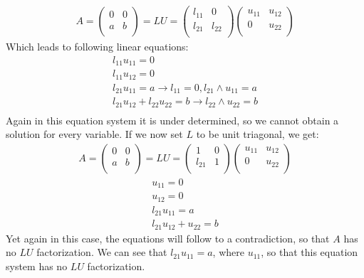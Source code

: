 \begin{gather*}
A = \left( \begin{array}{cc}
0 & 0 \\
a & b \\
\end{array} \right)
= LU = 
\left( \begin{array}{cc}
l_{11} & 0 \\
l_{21} & l_{22} \\
\end{array} \right)
\left( \begin{array}{cc}
u_{11} & u_{12} \\
0 & u_{22} \\
\end{array} \right)
\end{gather*}
Which leads to following linear equations:
\begin{gather*}
l_{11} u_{11} = 0 \\
l_{11} u_{12} = 0 \\
l_{21} u_{11} = a  \rightarrow l_{11} = 0, l_{21} \wedge u_{11} = a\\
l_{21} u_{12} + l_{22} u_{22} = b \rightarrow l_{22} \wedge u_{22} = b\\
\end{gather*}
Again in this equation system it is under determined, so we cannot obtain a solution for every variable.
If we now set $L$ to be unit triagonal, we get:
\begin{gather*}
A = \left( \begin{array}{cc}
0 & 0 \\
a & b \\
\end{array} \right)
= LU = 
\left( \begin{array}{cc}
1 & 0 \\
l_{21} & 1 \\
\end{array} \right)
\left( \begin{array}{cc}
u_{11} & u_{12} \\
0 & u_{22} \\
\end{array} \right)
\end{gather*}
\begin{gather*}
\label{3}
u_{11} = 0  \\
u_{12} = 0 \\
l_{21} u_{11} = a \\
l_{21} u_{12} + u_{22} = b
\end{gather*}
Yet again in this case, the equations will follow to a contradiction, so that $A$ has no $LU$ factorization. We can see that $l_{21} u_{11} = a$, where $u_{11}$, so that this equation system has no $LU$ factorization.

